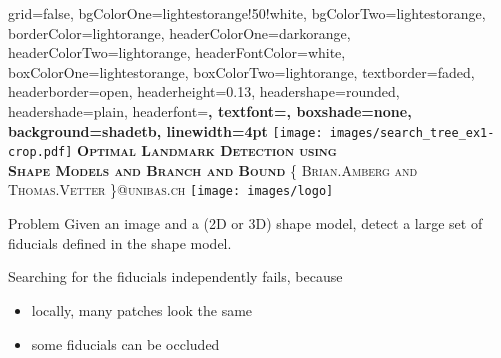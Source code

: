 \documentclass[landscape,final,a0paper,fontscale=0.27065]{baposter}
\begin{document}
\begin{poster}%
{
  grid=false,
  bgColorOne=lightestorange!50!white,
  bgColorTwo=lightestorange,
  borderColor=lightorange,
  headerColorOne=darkorange,
  headerColorTwo=lightorange,
  headerFontColor=white,
  boxColorOne=lightestorange,
  boxColorTwo=lightorange,
  textborder=faded,
  headerborder=open,
  headerheight=0.13\textheight,
  headershape=rounded,
  headershade=plain,
  headerfont=\Large\bf\textsc, %
  textfont={\setlength{\parindent}{0.5em}},
  boxshade=none,
  background=shadetb,
  linewidth=4pt
  }{\texttt{[image: images/search\_tree\_ex1-crop.pdf]}}{
  \bf\textsc{Optimal Landmark Detection using\\[0.2em]Shape Models and Branch and Bound}\vspace{0.5em}
  }{
    \textsc{\{ Brian.Amberg and Thomas.Vetter \}@unibas.ch}}{
      \texttt{[image: images/logo]}
    }
%
\newcommand{\colouredcircle}{%
  \tikz{\useasboundingbox (-0.2em,-0.32em) rectangle(0.2em,0.32em); \draw[draw=black,fill=lightblue,line width=0.03em] (0,0) circle(0.18em);}}

  \begin{posterbox}[name=problem,column=0,row=0]{Problem}
    Given an image and a (2D or 3D) shape model, detect a large set of fiducials defined in the shape model.

    Searching for the fiducials independently fails, because
    \begin{itemize}
    \setlength{\itemsep}{0em}
    \item locally, many patches look the same
    \item some fiducials can be occluded 
    \end{itemize}
    

\end{posterbox}
\end{poster}
\end{document}
